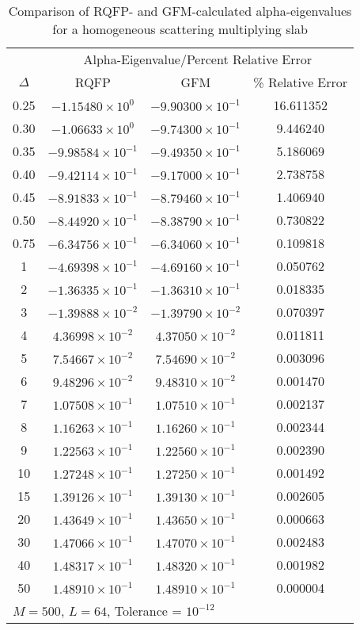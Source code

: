 \begin{table*}[h]
\centering{}
\caption{Comparison of RQFP- and GFM-calculated alpha-eigenvalues for a homogeneous scattering multiplying slab}
\label{table:CompHomogMult}
\begin{tabular}{@{}cccc@{}}\toprule
& \multicolumn{3}{c}{Alpha-Eigenvalue/Percent Relative Error} \\
\cmidrule{2-4} $\Delta$ & RQFP & GFM & \% Relative Error \\
\midrule
0.25 & $-1.15480 \times 10^{0}$ & $-9.90300 \times 10^{-1}$ & 16.611352 \\ 
0.30 & $-1.06633 \times 10^{0}$ & $-9.74300 \times 10^{-1}$ & 9.446240 \\ 
0.35 & $-9.98584 \times 10^{-1}$ & $-9.49350 \times 10^{-1}$ & 5.186069 \\ 
0.40 & $-9.42114 \times 10^{-1}$ & $-9.17000 \times 10^{-1}$ & 2.738758 \\ 
0.45 & $-8.91833 \times 10^{-1}$ & $-8.79460 \times 10^{-1}$ & 1.406940 \\ 
0.50 & $-8.44920 \times 10^{-1}$ & $-8.38790 \times 10^{-1}$ & 0.730822 \\ 
0.75 & $-6.34756 \times 10^{-1}$ & $-6.34060 \times 10^{-1}$ & 0.109818 \\ 
1 & $-4.69398 \times 10^{-1}$ & $-4.69160 \times 10^{-1}$ & 0.050762 \\ 
2 & $-1.36335 \times 10^{-1}$ & $-1.36310 \times 10^{-1}$ & 0.018335 \\ 
3 & $-1.39888 \times 10^{-2}$ & $-1.39790 \times 10^{-2}$ & 0.070397 \\ 
4 & $4.36998 \times 10^{-2}$ & $4.37050 \times 10^{-2}$ & 0.011811 \\ 
5 & $7.54667 \times 10^{-2}$ & $7.54690 \times 10^{-2}$ & 0.003096 \\ 
6 & $9.48296 \times 10^{-2}$ & $9.48310 \times 10^{-2}$ & 0.001470 \\ 
7 & $1.07508 \times 10^{-1}$ & $1.07510 \times 10^{-1}$ & 0.002137 \\ 
8 & $1.16263 \times 10^{-1}$ & $1.16260 \times 10^{-1}$ & 0.002344 \\ 
9 & $1.22563 \times 10^{-1}$ & $1.22560 \times 10^{-1}$ & 0.002390 \\ 
10 & $1.27248 \times 10^{-1}$ & $1.27250 \times 10^{-1}$ & 0.001492 \\ 
15 & $1.39126 \times 10^{-1}$ & $1.39130 \times 10^{-1}$ & 0.002605 \\ 
20 & $1.43649 \times 10^{-1}$ & $1.43650 \times 10^{-1}$ & 0.000663 \\ 
30 & $1.47066 \times 10^{-1}$ & $1.47070 \times 10^{-1}$ & 0.002483 \\ 
40 & $1.48317 \times 10^{-1}$ & $1.48320 \times 10^{-1}$ & 0.001982 \\ 
50 & $1.48910 \times 10^{-1}$ & $1.48910 \times 10^{-1}$ & 0.000004 \\ 
\bottomrule
\multicolumn{4}{l}{$M = 500$, $L = 64$, Tolerance = $10^{-12}$} \\
\end{tabular}
\end{table*}


